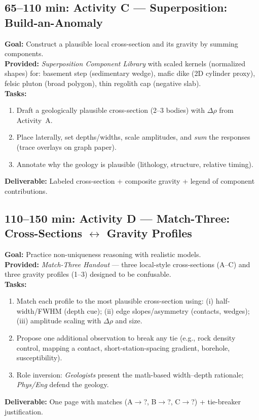 \documentclass[11pt,a4paper]{article}
\begin{document}
\subsection*{65--110 min: Activity C --- Superposition: Build-an-Anomaly}
\textbf{Goal:} Construct a plausible local cross-section and its gravity by summing components.\\
\textbf{Provided:} \emph{Superposition Component Library} with scaled kernels (normalized shapes) for: basement step (sedimentary wedge), mafic dike (2D cylinder proxy), felsic pluton (broad polygon), thin regolith cap (negative slab).\\
\textbf{Tasks:}
\begin{enumerate}
  \item Draft a geologically plausible cross-section (2--3 bodies) with $\Delta\rho$ from Activity~A.
  \item Place laterally, set depths/widths, scale amplitudes, and \emph{sum} the responses (trace overlays on graph paper).
  \item Annotate why the geology is plausible (lithology, structure, relative timing).
\end{enumerate}
\textbf{Deliverable:} Labeled cross-section + composite gravity + legend of component contributions.

\subsection*{110--150 min: Activity D --- Match-Three: Cross-Sections \texorpdfstring{$\leftrightarrow$}{↔} Gravity Profiles}
\textbf{Goal:} Practice non-uniqueness reasoning with realistic models.\\
\textbf{Provided:} \emph{Match-Three Handout} --- three local-style cross-sections (A--C) and three gravity profiles (1--3) designed to be confusable.\\
\textbf{Tasks:}
\begin{enumerate}
  \item Match each profile to the most plausible cross-section using: (i) half-width/FWHM (depth cue); (ii) edge slopes/asymmetry (contacts, wedges); (iii) amplitude scaling with $\Delta\rho$ and size.
  \item Propose one additional observation to break any tie (e.g., rock density control, mapping a contact, short-station-spacing gradient, borehole, susceptibility).
  \item Role inversion: \emph{Geologists} present the math-based width--depth rationale; \emph{Phys/Eng} defend the geology.
\end{enumerate}
\textbf{Deliverable:} One page with matches (A$\to$?, B$\to$?, C$\to$?) + tie-breaker justification.
\end{document}
